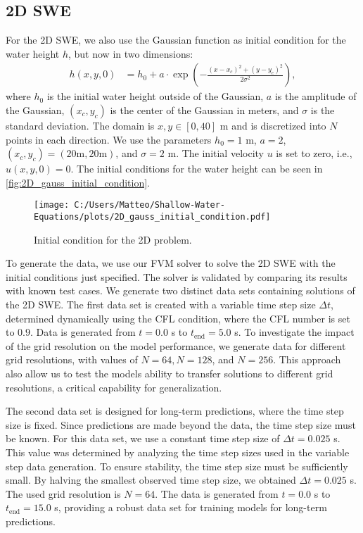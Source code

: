 \subsection*{2D SWE}
For the 2D SWE, we also use the Gaussian function as initial condition for the water height $h$, but now in two dimensions:
\begin{align}\label{eq:2D_swe_ic_gaussian}
    h(x,y,0) &= h_0 + a \cdot \exp \left( -\frac{{(x-x_c)}^2 + {(y-y_c)}^2}{2\sigma^2} \right), 
\end{align}
where $h_0$ is the initial water height outside of the Gaussian, $a$ is the amplitude of the Gaussian, $(x_c, y_c)$ is the center of the Gaussian in meters, and $\sigma$ is the standard deviation.
The domain is $x,y \in [0,40]$ m and is discretized into $N$ points in each direction.
We use the parameters $h_0 = 1$ m, $a = 2$, $(x_c, y_c) = (20 \text{m}, 20 \text{m})$, and $\sigma = 2$ m.
The initial velocity $u$ is set to zero, i.e., $u(x,y,0) = 0$.
The initial conditions for the water height can be seen in \autoref{fig:2D_gauss_initial_condition}.
\begin{figure}[H]
    \centering
    \texttt{[image: C:/Users/Matteo/Shallow-Water-Equations/plots/2D\_gauss\_initial\_condition.pdf]}
    \caption{Initial condition for the 2D problem.}\label{fig:2D_gauss_initial_condition_data_gen}
\end{figure}
To generate the data, we use our FVM solver to solve the 2D SWE with the initial conditions just specified.
The solver is validated by comparing its results with known test cases.
We generate two distinct data sets containing solutions of the 2D SWE.
The first data set is created with a variable time step size $\Delta t$, determined dynamically using the CFL condition, where the CFL number is set to $0.9$.
Data is generated from $t = 0.0$ s to $t_{\text{end}} = 5.0$ s.
To investigate the impact of the grid resolution on the model performance, we generate data for different grid resolutions, with values of $N = 64, N = 128$, and $N = 256$.
This approach also allow us to test the models ability to transfer solutions to different grid resolutions, a critical capability for generalization.

The second data set is designed for long-term predictions, where the time step size is fixed.
Since predictions are made beyond the data, the time step size must be known.
For this data set, we use a constant time step size of $\Delta t = 0.025$ s.
This value was determined by analyzing the time step sizes used in the variable step data generation.
To ensure stability, the time step size must be sufficiently small.
By halving the smallest observed time step size, we obtained $\Delta t = 0.025$ s.
The used grid resolution is $N = 64$.
The data is generated from $t = 0.0$ s to $t_{\text{end}} = 15.0$ s, providing a robust data set for training models for long-term predictions.

